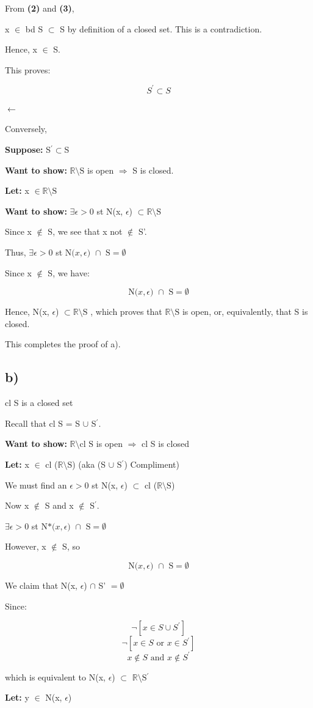 \documentclass{article}
\newcommand\ssc[2][\DefaultOpt]{%
  \def\DefaultOpt{#2}%
  \subsection[#1]{#2}%
}
\newcommand{\lt}[1]{\textbf{Let: } #1}
\newcommand{\supp}[1]{\textbf{Suppose: } #1}
\newcommand{\wts}[1]{\textbf{Want to show: } #1}
\newcommand{\bpth}[1]{\textbf{(#1)}}
\newcommand{\step}[2]{\begin{equation}\tag{#2}#1\end{equation}}
\newcommand{\br}{\mathbb{R}}       %
\newcommand{\ep}{\epsilon}         %
\newcommand{\sbs}{\subset}         %
\newcommand{\rar}{\Rightarrow}     %
\newcommand{\lla}{\longleftarrow}  %
\newcommand{\pr}{^\prime} 		   %
\newcommand{\butnot}[2]{#1\setminus{\textrm{#2}}}
\newcommand{\nbhe}[3]{\textrm{N(}#1, #2\textrm{) }\cap \textrm{ #3} = \emptyset}
\newcommand{\dnbhe}[3]{\textrm{N*(}#1, #2\textrm{) }\cap \textrm{ #3} = \emptyset}
\begin{document}
From \bpth{2} and \bpth{3}, \

x $\in$ bd S $\subset$ S by definition of a closed set. This is a contradiction. \

Hence, x $\in$ S.

This proves:
 
\[S\pr \subset S\]

$\lla$ \

Conversely, \

\supp{S$\pr \sbs $S}

\wts{$\butnot{\br}{S}$ is open $\rar$ S is closed.} \

\lt{x $\in \butnot{\br}{S}$}


\wts{$\exists \ep > 0$ st N(x, $\ep$) $\sbs \butnot{\br}{S}$}

Since x $\not\in$ S, we see that x not $\not\in$ S'.

Thus, $\exists \ep > 0$ st $\nbhe{x}{\epsilon}{S}$ \

Since x $\not\in$ S, we have:

\step{\nbhe{x}{\epsilon}{S}}{1}

Hence, N(x, $\ep$) $\sbs \butnot{\br}{S}$ , which proves that $\butnot{\br}{S}$ is open, or, equivalently, that S is closed. \

This completes the proof of a).

\ssc{b)}
cl S is a closed set \

Recall that cl S = S $\cup$ S$\pr$.

\wts{$\butnot{\br}{cl S}$ is open $\rar$ cl S is closed}

\lt{x $\in$ cl ($\butnot{\br}{S}$) (aka (S $\cup$ S$\pr$) Compliment)} \

We must find an $\ep > 0$ st N(x, $\ep$) $\subset$ cl ($\butnot{\br}{S}$) \

Now x $\not\in$ S and x $\not\in$ S$\pr$. \

$\exists \ep > 0$ st $\dnbhe{x}{\epsilon}{S}$ \

However, x $\not\in$ S, so \

\step{\nbhe{x}{\epsilon}{S}}{1}

We claim that N(x, $\ep$) $\cap$ S' $= \emptyset$ \

Since:

\[\neg [x \in S \cup S\pr]\]
\[\neg [x \in S \textrm{ or }x \in S\pr]\]
\[x \not\in S \textrm{ and }x \not\in S\pr\]

which is equivalent to N(x, $\ep$) $\sbs$ $\butnot{\br}{S$\pr$}$ \

\lt{y $\in$ N(x, $\ep$)}
\end{document}

